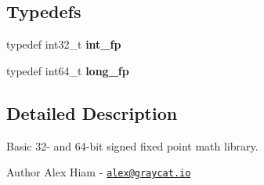 \subsection*{Typedefs}
\begin{DoxyCompactItemize}
\item 
typedef int32\+\_\+t {\bfseries int\+\_\+fp}\hypertarget{gcl-fixedpoint_8h_aa1a10f568b12a36dbfe95583fbbbe35a}{}\label{gcl-fixedpoint_8h_aa1a10f568b12a36dbfe95583fbbbe35a}

\item 
typedef int64\+\_\+t {\bfseries long\+\_\+fp}\hypertarget{gcl-fixedpoint_8h_abd8cbe1f4521c00730f7a9931b198281}{}\label{gcl-fixedpoint_8h_abd8cbe1f4521c00730f7a9931b198281}

\end{DoxyCompactItemize}


\subsection{Detailed Description}
Basic 32-\/ and 64-\/bit signed fixed point math library. 

\begin{DoxyAuthor}{Author}
Alex Hiam -\/ \href{mailto:alex@graycat.io}{\tt alex@graycat.\+io} 
\end{DoxyAuthor}
